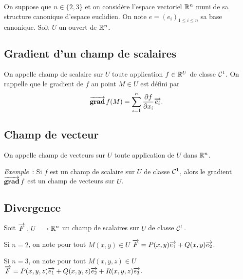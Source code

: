 On suppose que $n \in \{2, 3\}$ et on considère l'espace vectoriel $\mathbb{R}^n$ muni de sa structure canonique d'espace euclidien. On note $e=(e_i)_{1 \leqslant i \leqslant n}$ sa base canonique. Soit $U$ un ouvert de $\mathbb{R}^n$.

\subsection{Gradient d'un champ de scalaires}

On appelle champ de scalaire sur $U$ toute application $f \in \mathbb{R}^U$ de classe $\mathcal{C}^{1}$. On rappelle que le gradient de $f$ au point $M \in U$ est défini par
\begin{equation}
  \operatorname{\overrightarrow{\mathbf{grad}}}{f}(M) = \sum_{i=1}^n \dfrac{\partial{} f}{\partial{} x_i} \overrightarrow{e_i}.
\end{equation}

\subsection{Champ de vecteur}

On appelle champ de vecteurs sur $U$ toute application de $U$ dans $\mathbb{R}^n$.

\emph{Exemple}~: Si $f$ est un champ de scalaire sur $U$ de classe $\mathcal{C}^{1}$, alors le gradient $\operatorname{\overrightarrow{\mathbf{grad}}}{f}$ est un champ de vecteurs sur $U$.


\subsection{Divergence}

Soit $\overrightarrow{F} : U \longrightarrow \mathbb{R}^n$ un champ de scalaires sur $U$ de classe $\mathcal{C}^{1}$.

Si $n=2$, on note pour tout $M(x,y) \in U$ $\overrightarrow{F}=P(x,y)\overrightarrow{e_1} + Q(x,y)\overrightarrow{e_2}$.

Si $n=3$, on note pour tout $M(x,y,z) \in U$ $\overrightarrow{F}=P(x,y,z)\overrightarrow{e_1} + Q(x,y,z)\overrightarrow{e_2}+R(x,y,z)\overrightarrow{e_3}$.

